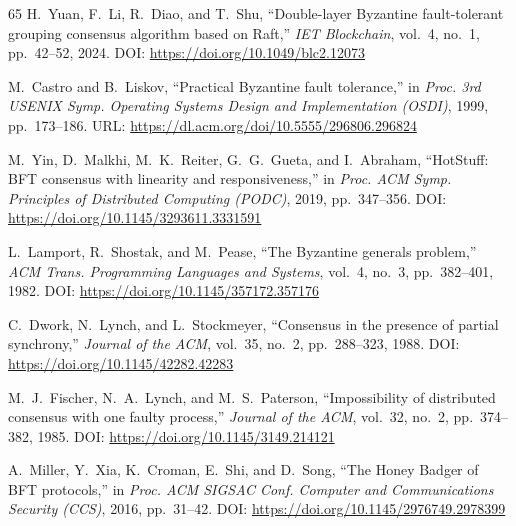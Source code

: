 \documentclass[journal]{IEEEtran}
\begin{document}
\begin{thebibliography}{65}
H.~Yuan, F.~Li, R.~Diao, and T.~Shu,
``Double-layer Byzantine fault-tolerant grouping consensus algorithm based on
Raft,''
\textit{IET Blockchain}, vol.~4, no.~1, pp.~42--52, 2024.
\newblock DOI: \url{https://doi.org/10.1049/blc2.12073}


M.~Castro and B.~Liskov,
``Practical Byzantine fault tolerance,''
in \textit{Proc. 3rd USENIX Symp. Operating Systems Design and Implementation
(OSDI)}, 1999, pp.~173--186.
\newblock URL: \url{https://dl.acm.org/doi/10.5555/296806.296824}

M.~Yin, D.~Malkhi, M.~K.~Reiter, G.~G.~Gueta, and I.~Abraham,
``HotStuff: BFT consensus with linearity and responsiveness,''
in \textit{Proc. ACM Symp. Principles of Distributed Computing (PODC)}, 2019,
pp.~347--356.
\newblock DOI: \url{https://doi.org/10.1145/3293611.3331591}

L.~Lamport, R.~Shostak, and M.~Pease,
``The Byzantine generals problem,''
\textit{ACM Trans. Programming Languages and Systems}, vol.~4, no.~3,
pp.~382--401, 1982.
\newblock DOI: \url{https://doi.org/10.1145/357172.357176}

C.~Dwork, N.~Lynch, and L.~Stockmeyer,
``Consensus in the presence of partial synchrony,''
\textit{Journal of the ACM}, vol.~35, no.~2, pp.~288--323, 1988.
\newblock DOI: \url{https://doi.org/10.1145/42282.42283}

M.~J.~Fischer, N.~A.~Lynch, and M.~S.~Paterson,
``Impossibility of distributed consensus with one faulty process,''
\textit{Journal of the ACM}, vol.~32, no.~2, pp.~374--382, 1985.
\newblock DOI: \url{https://doi.org/10.1145/3149.214121}

A.~Miller, Y.~Xia, K.~Croman, E.~Shi, and D.~Song,
``The Honey Badger of BFT protocols,''
in \textit{Proc. ACM SIGSAC Conf. Computer and Communications Security
(CCS)}, 2016, pp.~31--42.
\newblock DOI: \url{https://doi.org/10.1145/2976749.2978399}



\end{thebibliography}
\end{document}
